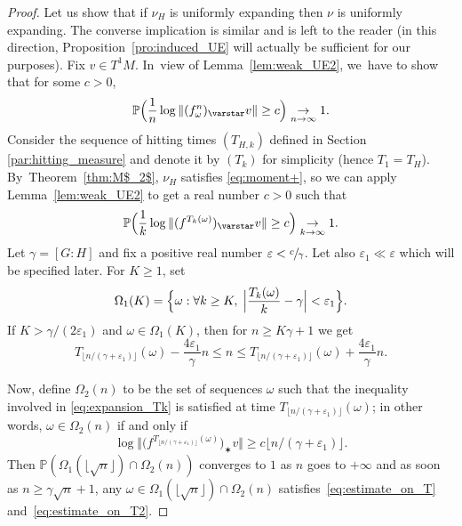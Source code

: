 \documentclass[JEP,XML,SOM,Unicode,published]{cedram}
\let\sep :
\let\e\varepsilon
\newcommand{\Bset}[1]{\Bigl\{#1\Bigr\}}
\newcommand{\norm}[1]{{\left\Vert#1\right\Vert}}
\newcommand{\anorm}[1]{{\Vert#1\Vert}}
\newcommand{\bnorm}[1]{{\bigl\Vert#1\bigr\Vert}}
\newcommand{\Babs}[1]{\Bigl\vert#1\Bigr\vert}
\newcommand{\unsur}[1]{\frac{1}{#1}}
\newcommand{\alrpar}[1]{(#1)}
\newcommand{\blrpar}[1]{\bigl(#1\bigr)}
\newcommand{\Blrpar}[1]{\Bigl(#1\Bigr)}
\newcommand{\pp}{\mathbb{P}}\let\P\pp
\theoremstyle{plain}
\theoremstyle{definition}
\begin{document}
\begin{proof}
Let us show that if $\nu_H$ is uniformly expanding then $\nu$ is uniformly expanding.
The converse implication is similar and is left to the reader (in
this direction, Proposition~\ref{pro:induced_UE} will actually be sufficient for our purposes).
Fix $ v\in T^1M$. In~view of Lemma~\ref{lem:weak_UE2}, we~have to show that for some $c>0$,
\begin{equation*}\label{eq:expansion_n}
\pp\Blrpar{ \unsur{n}\log \norm{ (f^n_\omega)_\varstar v} \geq c}
\underset{n\to\infty}{\to} 1.
\end{equation*}
Consider the sequence of hitting times $(T_{H,k})$ defined in Section \ref{par:hitting_measure} and
denote it by $(T_k)$
for simplicity (hence $T_1=T_H$). By~Theorem~\ref{thm:M$_2$},
$\nu_H$ satisfies \eqref{eq:moment+}, so we can apply
Lemma~\ref{lem:weak_UE2} to get a real number $c>0$ such that
\begin{equation}\label{eq:expansion_Tk}
\pp\Blrpar{ \unsur{k} \log\anorm{\alrpar{f^{T_{k}(\omega)}}_\varstar v} \geq c} \underset{k\to\infty}{\to} 1.
\end{equation}
Let $\gamma = [G:H]$ and fix a positive real number
$\e < \sfrac{c}{\gamma}$. Let also $\e_1\ll\e$ which will be specified later.
For $K\geq 1$, set
\begin{equation*}
\Omega_1(K)=\Bset{ \omega \sep  \forall k\geq K, \; \Babs{\frac{T_k(\omega)}{k} -\gamma} < \e_1 }.
\end{equation*}
If $K>\gamma/(2\e_1)$ and $\omega\in \Omega_1(K)$, then for $n\geq K\gamma+1$ we get
\begin{equation}\label{eq:estimate_on_T}
T_{\lfloor n/(\gamma+\e_1)\rfloor}(\omega)- \frac{4\e_1}{\gamma}n \leq n \leq T_{\lfloor n/(\gamma+\e_1)\rfloor}(\omega)+ \frac{4\e_1}{\gamma}n.
\end{equation}

Now, define $\Omega_2(n )$ to be the set of sequences $\omega$ such that
the inequality involved in \eqref{eq:expansion_Tk} is satisfied at time $T_{\lfloor n/(\gamma+\e_1)\rfloor}(\omega)$; in other words, $\omega\in \Omega_2(n)$ if and only if
\begin{equation}\label{eq:estimate_on_T2}
\log\bnorm{\blrpar{f^{T_{\lfloor n/(\gamma+\e_1)\rfloor}(\omega)}}_\varstar v} \geq c \lfloor n/(\gamma+\e_1)\rfloor.
\end{equation}
Then $\pp(\Omega_1(\lfloor\sqrt{n}\rfloor)\cap \Omega_2(n))$ converges to $1$ as $n$ goes to $+\infty$
and as soon as $n\geq \gamma\sqrt{n}+1$, any $\omega\in \Omega_1(\lfloor\sqrt{n}\rfloor)\cap \Omega_2(n)$
satisfies~\eqref{eq:estimate_on_T} and~\eqref{eq:estimate_on_T2}.


\end{proof}
\end{document}
